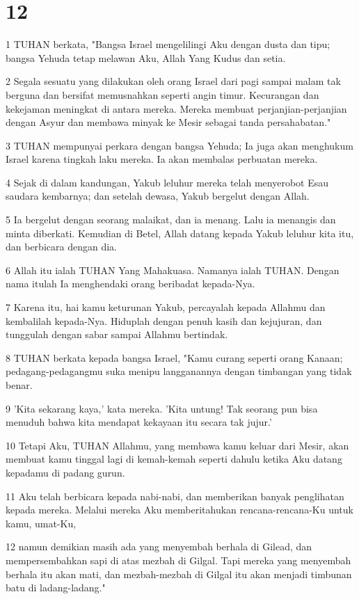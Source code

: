 \chapter{12}

\par 1 TUHAN berkata, "Bangsa Israel mengelilingi Aku dengan dusta dan tipu; bangsa Yehuda tetap melawan Aku, Allah Yang Kudus dan setia.
\par 2 Segala sesuatu yang dilakukan oleh orang Israel dari pagi sampai malam tak berguna dan bersifat memusnahkan seperti angin timur. Kecurangan dan kekejaman meningkat di antara mereka. Mereka membuat perjanjian-perjanjian dengan Asyur dan membawa minyak ke Mesir sebagai tanda persahabatan."
\par 3 TUHAN mempunyai perkara dengan bangsa Yehuda; Ia juga akan menghukum Israel karena tingkah laku mereka. Ia akan membalas perbuatan mereka.
\par 4 Sejak di dalam kandungan, Yakub leluhur mereka telah menyerobot Esau saudara kembarnya; dan setelah dewasa, Yakub bergelut dengan Allah.
\par 5 Ia bergelut dengan seorang malaikat, dan ia menang. Lalu ia menangis dan minta diberkati. Kemudian di Betel, Allah datang kepada Yakub leluhur kita itu, dan berbicara dengan dia.
\par 6 Allah itu ialah TUHAN Yang Mahakuasa. Namanya ialah TUHAN. Dengan nama itulah Ia menghendaki orang beribadat kepada-Nya.
\par 7 Karena itu, hai kamu keturunan Yakub, percayalah kepada Allahmu dan kembalilah kepada-Nya. Hiduplah dengan penuh kasih dan kejujuran, dan tunggulah dengan sabar sampai Allahmu bertindak.
\par 8 TUHAN berkata kepada bangsa Israel, "Kamu curang seperti orang Kanaan; pedagang-pedagangmu suka menipu langganannya dengan timbangan yang tidak benar.
\par 9 'Kita sekarang kaya,' kata mereka. 'Kita untung! Tak seorang pun bisa menuduh bahwa kita mendapat kekayaan itu secara tak jujur.'
\par 10 Tetapi Aku, TUHAN Allahmu, yang membawa kamu keluar dari Mesir, akan membuat kamu tinggal lagi di kemah-kemah seperti dahulu ketika Aku datang kepadamu di padang gurun.
\par 11 Aku telah berbicara kepada nabi-nabi, dan memberikan banyak penglihatan kepada mereka. Melalui mereka Aku memberitahukan rencana-rencana-Ku untuk kamu, umat-Ku,
\par 12 namun demikian masih ada yang menyembah berhala di Gilead, dan mempersembahkan sapi di atas mezbah di Gilgal. Tapi mereka yang menyembah berhala itu akan mati, dan mezbah-mezbah di Gilgal itu akan menjadi timbunan batu di ladang-ladang."
